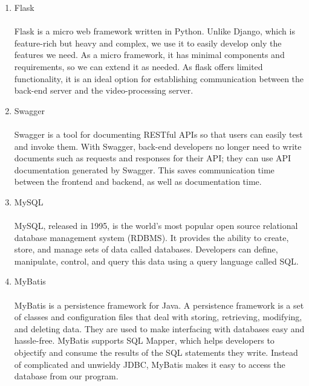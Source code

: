\begin{enumerate}[label=\arabic*]
\begin{enumerate}[label=\alph*.]
            \item Flask\\
            \\
            Flask is a micro web framework written in Python. Unlike Django, which is feature-rich but heavy and complex, we use it to easily develop only the features we need. As a micro framework, it has minimal components and requirements, so we can extend it as needed. As flask offers limited functionality, it is an ideal option for establishing communication between the back-end server and the video-processing server.\\

            \item Swagger\\
            \\
            Swagger is a tool for documenting RESTful APIs so that users can easily test and invoke them. With Swagger, back-end developers no longer need to write documents such as requests and responses for their API; they can use API documentation generated by Swagger. This saves communication time between the frontend and backend, as well as documentation time.\\

            \item MySQL\\
            \\
            MySQL, released in 1995, is the world's most popular open source relational database management system (RDBMS). It provides the ability to create, store, and manage sets of data called databases. Developers can define, manipulate, control, and query this data using a query language called SQL. \\

            \item MyBatis\\
            \\
            MyBatis is a persistence framework for Java. A persistence framework is a set of classes and configuration files that deal with storing, retrieving, modifying, and deleting data. They are used to make interfacing with databases easy and hassle-free. MyBatis supports SQL Mapper, which helps developers to objectify and consume the results of the SQL statements they write. Instead of complicated and unwieldy JDBC, MyBatis makes it easy to access the database from our program.\\


\end{enumerate}
\end{enumerate}
